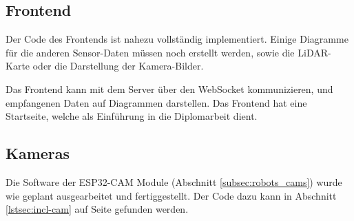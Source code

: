 \subsection{Frontend}
Der Code des Frontends ist nahezu vollständig implementiert.
%
Einige Diagramme für die anderen Sensor-Daten müssen noch erstellt werden,
sowie die LiDAR-Karte oder die Darstellung der Kamera-Bilder.

Das Frontend kann mit dem Server über den WebSocket kommunizieren,
und empfangenen Daten auf Diagrammen darstellen. 
%
Das Frontend hat eine Startseite, welche als Einführung in die Diplomarbeit dient.

\subsection{Kameras}
Die Software der ESP32-CAM Module (Abschnitt \ref{subsec:robots_cams})
wurde wie geplant ausgearbeitet und fertiggestellt.
%
Der Code dazu kann in Abschnitt \ref{lstsec:incl-cam} auf Seite \pageref{lstsec:incl-cam} gefunden werden.